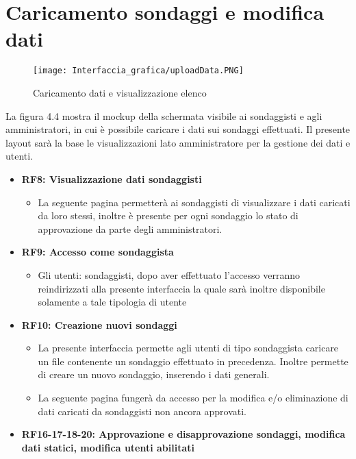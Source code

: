 \section{Caricamento sondaggi e modifica dati}
    \label{fig:4.4}
    \begin{figure}[H]
        \center
        \texttt{[image: Interfaccia\_grafica/uploadData.PNG]}
        \caption{Caricamento dati e visualizzazione elenco}
    \end{figure} 
    La figura 4.4 mostra il mockup della schermata visibile ai sondaggisti e agli amministratori, in cui è possibile caricare i dati sui sondaggi effettuati.\newline
    Il presente layout sarà la base le visualizzazioni lato amministratore per la gestione dei dati e utenti.
    \begin{itemize}
        \item \textbf{RF8: Visualizzazione dati sondaggisti} \begin{itemize}
            \item La seguente pagina permetterà ai sondaggisti di visualizzare i dati caricati da loro stessi, inoltre è presente per ogni sondaggio lo stato di approvazione da parte degli amministratori.
        \end{itemize}
        \item \textbf{RF9: Accesso come sondaggista} \begin{itemize}
            \item Gli utenti: sondaggisti, dopo aver effettuato l'accesso verranno reindirizzati alla presente interfaccia la quale sarà inoltre disponibile solamente a tale tipologia di utente
        \end{itemize}
        \item \textbf{RF10: Creazione nuovi sondaggi} \begin{itemize}
            \item La presente interfaccia permette agli utenti di tipo sondaggista caricare un file contenente un sondaggio effettuato in precedenza. Inoltre permette di creare un nuovo sondaggio, inserendo i dati generali.
            \item La seguente pagina fungerà da accesso per la modifica e/o eliminazione di dati caricati da sondaggisti non ancora approvati.
        \end{itemize}
        \item \textbf{RF16-17-18-20: Approvazione e disapprovazione sondaggi, modifica dati statici, modifica utenti abilitati} \begin{itemize}

\end{itemize}
\end{itemize}
